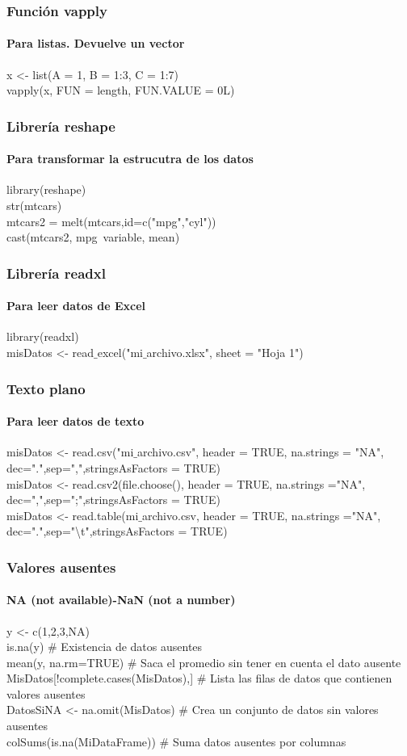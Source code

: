 \documentclass[12pt]{beamer}
\begin{document}
\begin{frame}
	\frametitle{Función vapply}
	\framesubtitle{Para listas. Devuelve un vector}
	x <- list(A = 1, B = 1:3, C = 1:7)\\
	vapply(x, FUN = length, FUN.VALUE = 0L)
\end{frame}

\begin{frame}
	\frametitle{Librería reshape}
	\framesubtitle{Para transformar la estrucutra de los datos}
	library(reshape)\\
	str(mtcars)\\
	mtcars2 = melt(mtcars,id=c("mpg","cyl"))\\
	cast(mtcars2, mpg~variable, mean)\\
	
\end{frame}

\begin{frame}
	\frametitle{Librería readxl}
	\framesubtitle{Para leer datos de Excel}
	library(readxl)\\
	misDatos <- read$\_$excel("mi$\_$archivo.xlsx", sheet = "Hoja 1")
	
\end{frame}

\begin{frame}
	\frametitle{Texto plano}
	\framesubtitle{Para leer datos de texto}
	
	misDatos <- read.csv("mi$\_$archivo.csv", header = TRUE, na.strings = "NA", dec=".",sep=",",stringsAsFactors = TRUE)\\
	misDatos <- read.csv2(file.choose(), header = TRUE, na.strings ="NA", dec=",",sep=";",stringsAsFactors = TRUE)\\
	
	misDatos <- read.table(mi$\_$archivo.csv, header = TRUE, na.strings ="NA", dec=".",sep="\textbackslash t",stringsAsFactors = TRUE)
	
\end{frame}

\begin{frame}
	\frametitle{Valores ausentes}
	\framesubtitle{ NA (not available)-NaN (not a number)}
	
	y <- c(1,2,3,NA)\\
	is.na(y) $\#$  Existencia de datos ausentes\\
	mean(y, na.rm=TRUE) $\#$ Saca el promedio sin tener en cuenta el dato ausente\\
	MisDatos[!complete.cases(MisDatos),]  $\#$ Lista las filas de datos que contienen valores ausentes\\
	DatosSiNA <- na.omit(MisDatos)  $\#$  Crea un conjunto de datos sin valores ausentes\\
	colSums(is.na(MiDataFrame)) $\#$ Suma datos ausentes por columnas
	
\end{frame}
\end{document}

